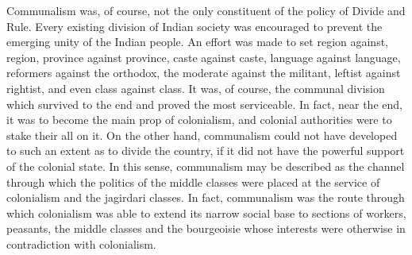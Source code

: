 \begin{multicols}{2}
Communalism was, of course, not the only constituent of the policy of Divide and Rule. Every existing division of Indian society was encouraged to prevent the emerging unity of the Indian people. An effort was made to set region against, region, province against province, caste against caste, language against language, reformers against the orthodox, the moderate against the militant, leftist against rightist, and even class against class. It was, of course, the communal division which survived to the end and proved the most serviceable. In fact, near the end, it was to become the main prop of colonialism, and colonial authorities were to stake their all on it. On the other hand, communalism could not have developed to such an extent as to divide the country, if it did not have the powerful support of the colonial state. In this sense, communalism may be described as the channel through which the politics of the middle classes were placed at the service of colonialism and the jagirdari classes. In fact, communalism was the route through which colonialism was able to extend its narrow social base to sections of workers, peasants, the middle classes and the bourgeoisie whose interests were otherwise in contradiction with colonialism.


\end{multicols}
